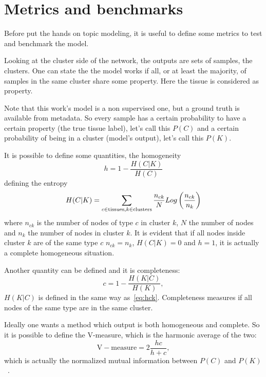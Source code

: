 \section{Metrics and benchmarks}
Before put the hands on topic modeling, it is useful to define some metrics to test and benchmark the model.

Looking at the cluster side of the network, the outputs are sets of samples, the clusters. One can state the the model works if all, or at least the majority, of samples in the same cluster share some property. Here the tissue is considered as property.

Note that this work's model is a non supervised one, but a ground truth is available from metadata. So every sample has a certain probability to have a certain property (the true tissue label), let's call this $P(C)$ and a certain probability of being in a cluster (model's output), let's call this $P(K)$.

It is possible to define some quantities, the homogeneity
\begin{equation}\label{eq:homogeneity}
    h=1-\frac{H(C|K)}{H(C)}
\end{equation}
defining the entropy
\begin{equation}\label{eq:hck}
    H(C|K)=\sum_{c\in \mathrm{tissues},\\ k \in \mathrm{clusters}}\frac{n_{c k}}{N}Log\left(\frac{n_{c k}}{n_k}\right)
\end{equation}
where $n_{c k}$ is the number of nodes of type $c$ in cluster $k$, $N$ the number of nodes and $n_k$ the number of nodes in cluster $k$. It is evident that if all nodes inside cluster $k$ are of the same type $c$ $n_{c k}=n_{k}$, $H(C|K)=0$ and $h=1$, it is actually a complete homogeneous situation.

Another quantity can be defined and it is completeness:
\begin{equation}\label{eq:completness}
    c=1-\frac{H(K|C)}{H(K)},
\end{equation}
$H(K|C)$ is defined in the same way as~\ref{eq:hck}. Completeness measures if all nodes of the same type are in the same cluster.

Ideally one wants a method which output is both homogeneous and complete. So it is possible to define the V-measure, which is the harmonic average of the two:
\begin{equation}\label{eq:mutualinformation}
    \mathrm{V-measure}=2\frac{h c}{h + c},
\end{equation}
which is actually the normalized mutual information between $P(C)$ and $P(K)$~\cite{rosenberg2007v}.

